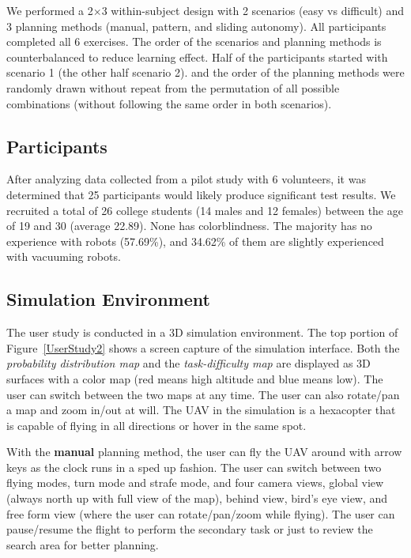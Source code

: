 We performed a 2$\times$3 within-subject design with 2 scenarios (easy vs difficult) and 3 planning methods (manual, pattern, and sliding autonomy). All participants completed all 6 exercises. The order of the scenarios and planning methods is counterbalanced to reduce learning effect. Half of the participants started with scenario 1 (the other half scenario 2). and the order of the planning methods were randomly drawn without repeat from the permutation of all possible combinations (without following the same order in both scenarios).

\subsection{Participants}

After analyzing data collected from a pilot study with 6 volunteers, it was determined that 25 participants would likely produce significant test results. We recruited a total of 26 college students (14 males and 12 females) between the age of 19 and 30 (average 22.89). None has colorblindness. The majority has no experience with robots (57.69\%), and 34.62\% of them are slightly experienced with vacuuming robots.

\subsection{Simulation Environment}

The user study is conducted in a 3D simulation environment. The top portion of Figure~\ref{UserStudy2} shows a screen capture of the simulation interface. Both the \textit{probability distribution map} and the \textit{task-difficulty map} are displayed as 3D surfaces with a color map (red means high altitude and blue means low). The user can switch between the two maps at any time. The user can also rotate/pan a map and zoom in/out at will. The UAV in the simulation is a hexacopter that is capable of flying in all directions or hover in the same spot.

With the \textbf{manual} planning method, the user can fly the UAV around with arrow keys as the clock runs in a sped up fashion. The user can switch between two flying modes, turn mode and strafe mode, and four camera views, global view (always north up with full view of the map), behind view, bird's eye view, and free form view (where the user can rotate/pan/zoom while flying). The user can pause/resume the flight to perform the secondary task or just to review the search area for better planning.

